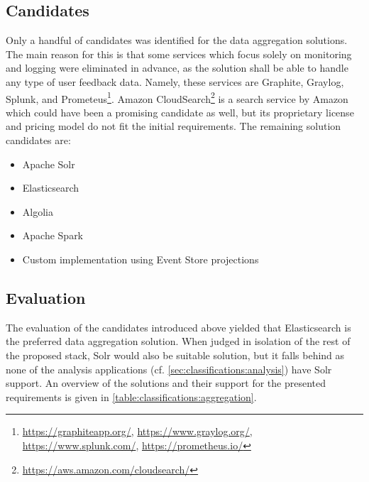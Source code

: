 \subsection{Candidates}

Only a handful of candidates was identified for the data aggregation solutions.
The main reason for this is that some services which focus solely on monitoring and logging were eliminated in advance, as the solution shall be able to handle any type of user feedback data.
Namely, these services are Graphite, Graylog, Splunk, and Prometeus\footnote{\url{https://graphiteapp.org/}, \url{https://www.graylog.org/}, \url{https://www.splunk.com/}, \url{https://prometheus.io/}}.
Amazon CloudSearch\footnote{\url{https://aws.amazon.com/cloudsearch/}} is a search service by Amazon which could have been a promising candidate as well, but its proprietary license and pricing model do not fit the initial requirements.
The remaining solution candidates are:

\begin{itemize}[noitemsep]
\item Apache Solr
\item Elasticsearch
\item Algolia
\item Apache Spark
\item Custom implementation using Event Store projections
\end{itemize}


\subsection{Evaluation}

The evaluation of the candidates introduced above yielded that Elasticsearch is the preferred data aggregation solution.
When judged in isolation of the rest of the proposed stack, Solr would also be suitable solution, but it falls behind as none of the analysis applications (cf. \cref{sec:classifications:analysis}) have Solr support.
An overview of the solutions and their support for the presented requirements is given in \cref{table:classifications:aggregation}.

